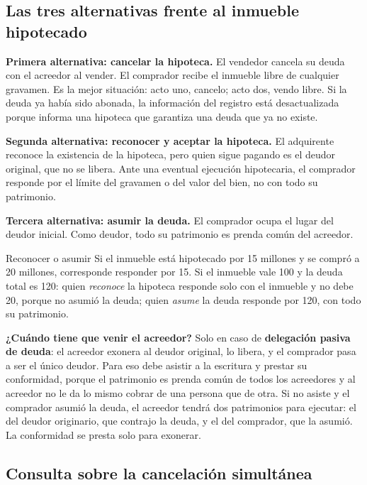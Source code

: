 \documentclass[12pt,oneside]{book}
\begin{document}
\subsection{Las tres alternativas frente al inmueble hipotecado}

\textbf{Primera alternativa: cancelar la hipoteca.} El vendedor cancela su deuda con el acreedor al vender. El comprador recibe el inmueble libre de cualquier gravamen. Es la mejor situación: acto uno, cancelo; acto dos, vendo libre. Si la deuda ya había sido abonada, la información del registro está desactualizada porque informa una hipoteca que garantiza una deuda que ya no existe.

\textbf{Segunda alternativa: reconocer y aceptar la hipoteca.} El adquirente reconoce la existencia de la hipoteca, pero quien sigue pagando es el deudor original, que no se libera. Ante una eventual ejecución hipotecaria, el comprador responde por el límite del gravamen o del valor del bien, no con todo su patrimonio.

\textbf{Tercera alternativa: asumir la deuda.} El comprador ocupa el lugar del deudor inicial. Como deudor, todo su patrimonio es prenda común del acreedor.

\begin{example}{Reconocer o asumir}
Si el inmueble está hipotecado por 15 millones y se compró a 20 millones, corresponde responder por 15. Si el inmueble vale 100 y la deuda total es 120: quien \textit{reconoce} la hipoteca responde solo con el inmueble y no debe 20, porque no asumió la deuda; quien \textit{asume} la deuda responde por 120, con todo su patrimonio.
\end{example}

\begin{important}
\textbf{¿Cuándo tiene que venir el acreedor?} Solo en caso de \textbf{delegación pasiva de deuda}: el acreedor exonera al deudor original, lo libera, y el comprador pasa a ser el único deudor. Para eso debe asistir a la escritura y prestar su conformidad, porque el patrimonio es prenda común de todos los acreedores y al acreedor no le da lo mismo cobrar de una persona que de otra. Si no asiste y el comprador asumió la deuda, el acreedor tendrá dos patrimonios para ejecutar: el del deudor originario, que contrajo la deuda, y el del comprador, que la asumió. La conformidad se presta solo para exonerar.
\end{important}

\subsection{Consulta sobre la cancelación simultánea}
\end{document}
